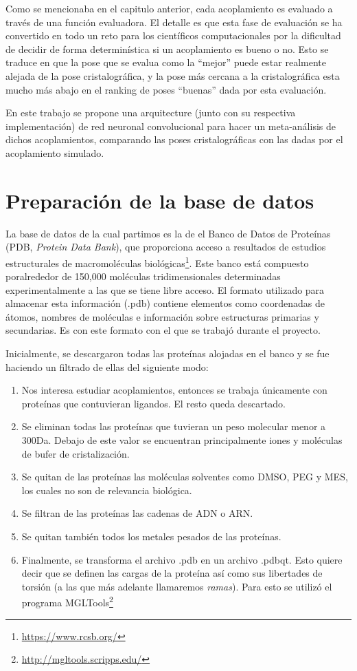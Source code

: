 Como se mencionaba en el capitulo anterior, cada acoplamiento es
evaluado a través de una función evaluadora. El detalle es que esta
fase de evaluación se ha convertido en todo un reto para los
científicos computacionales por la dificultad de decidir de forma
determinística si un acoplamiento es bueno o no. Esto se traduce en
que la pose que se evalua como la ``mejor'' puede estar realmente
alejada de la pose cristalográfica, y la pose más cercana a la
cristalográfica esta mucho más abajo en el ranking de poses ``buenas''
dada por esta evaluación.

En este trabajo se propone una arquitecture (junto con su respectiva
implementación) de red neuronal convolucional para hacer un
meta-análisis de dichos acoplamientos, comparando las poses
cristalográficas con las dadas por el acoplamiento simulado.

\section{Preparación de la base de datos}
La base de datos de la cual partimos es la de el Banco de Datos de
Proteínas (PDB, \textit{Protein Data Bank}), que proporciona acceso a
resultados de estudios estructurales de macromoléculas
biológicas\footnote{\url{https://www.rcsb.org/}}. Este banco está
compuesto poralrededor de 150,000 moléculas tridimensionales
determinadas experimentalmente a las que se tiene libre acceso. El
formato utilizado para almacenar esta información (.pdb) contiene
elementos como coordenadas de átomos, nombres de moléculas e
información sobre estructuras primarias y secundarias. Es con este
formato con el que se trabajó durante el proyecto.

Inicialmente, se descargaron todas las proteínas alojadas en el banco
y se fue haciendo un filtrado de ellas del siguiente modo:
\begin{enumerate}
  \item Nos interesa estudiar acoplamientos, entonces se trabaja únicamente
  con proteínas que contuvieran ligandos. El resto queda descartado.
  \item Se eliminan todas las proteínas que tuvieran un peso
    molecular menor a 300Da. Debajo de este valor se encuentran
    principalmente iones y moléculas de bufer de cristalización.
  \item Se quitan de las proteínas las moléculas solventes
  como DMSO, PEG y MES, los cuales no son de relevancia biológica.\@
  \item Se filtran de las proteínas las cadenas de ADN o ARN.\@
  \item Se quitan también todos los metales pesados de las proteínas.
  \item Finalmente, se transforma el archivo .pdb en un archivo
    .pdbqt.  Esto quiere decir que se definen las cargas de la
    proteína así como sus libertades de torsión (a las que más
    adelante llamaremos \textit{ramas}). Para esto se utilizó el
    programa MGLTools\footnote{\url{http://mgltools.scripps.edu/}}
\end{enumerate}

